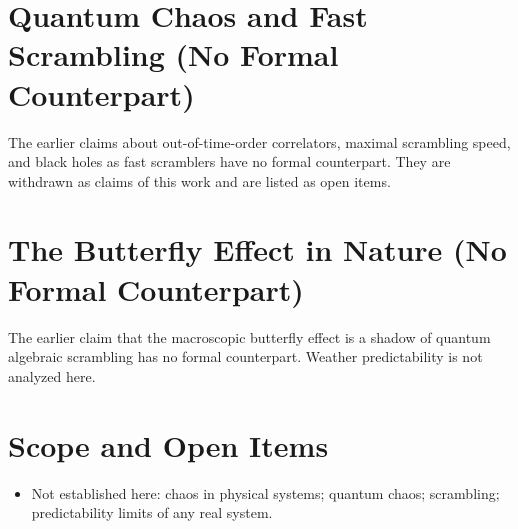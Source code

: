 \documentclass[11pt, a4paper]{article}
\begin{document}
\section{Quantum Chaos and Fast Scrambling (No Formal Counterpart)}
The earlier claims about out-of-time-order correlators, maximal scrambling speed, and black holes as fast scramblers have no formal counterpart. They are withdrawn as claims of this work and are listed as open items.

\section{The Butterfly Effect in Nature (No Formal Counterpart)}
The earlier claim that the macroscopic butterfly effect is a shadow of quantum algebraic scrambling has no formal counterpart. Weather predictability is not analyzed here.

\section{Scope and Open Items}
\begin{itemize}
  \item Not established here: chaos in physical systems; quantum chaos; scrambling; predictability limits of any real system.
\end{itemize}
\end{document}
